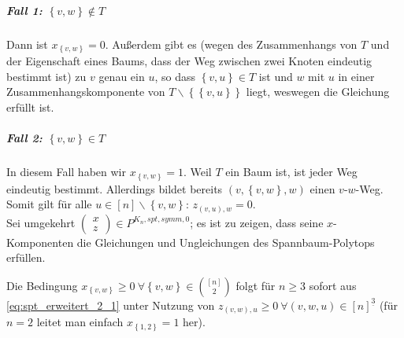 \documentclass[10p,a4paper,BCOR = 12mm, DIV=15]{scrbook}
\begin{document}
{\begin{bew}
\subparagraph{Fall 1: $\left\{v, w\right\}\notin T$} Dann ist $x_{\left\{v, w\right\}}=0$. Außerdem gibt es (wegen des Zusammenhangs von $T$ und der Eigenschaft eines Baums, dass der Weg zwischen zwei Knoten eindeutig bestimmt ist) zu $v$ genau ein $u$, so dass $\left\{v, u\right\}\in T$ ist und $w$ mit $u$ in einer Zusammenhangskomponente von $T\backslash \left\{\left\{v, u\right\}\right\}$ liegt, weswegen die Gleichung erfüllt ist.

\subparagraph{Fall 2: $\left\{v, w\right\}\in T$} In diesem Fall haben wir $x_{\left\{v, w\right\}}=1$. Weil $T$ ein Baum ist, ist jeder Weg eindeutig bestimmt. Allerdings bildet bereits $\left(v, \left\{v, w\right\}, w\right)$ einen $v$-$w$-Weg. Somit gilt für alle $u\in \left[n\right]\backslash \left\{v, w\right\}$: $z_{(v, u), w}=0$.
\\

Sei umgekehrt $\left(
\begin{array}{c}
x \\
z
\end{array}\right) \in P^{K_n, spt, symm, 0}$; es ist zu zeigen, dass seine $x$-Komponenten die Gleichungen und Ungleichungen des Spannbaum-Polytops erfüllen.

Die Bedingung $x_{\left\{v, w\right\}} \geq 0 \ \forall \left\{v, w\right\} \in {\left[n\right] \choose 2}$ folgt für $n\geq 3$ sofort aus \eqref{eq:spt_erweitert_2_1} unter Nutzung von $z_{\left(v, w\right), u} \geq 0 \ \forall \left(v, w, u\right) \in \left[n\right]^{\underline{3}}$ (für $n=2$ leitet man einfach $x_{\left\{1, 2\right\}} = 1$ her).


\end{bew}}
\end{document}
